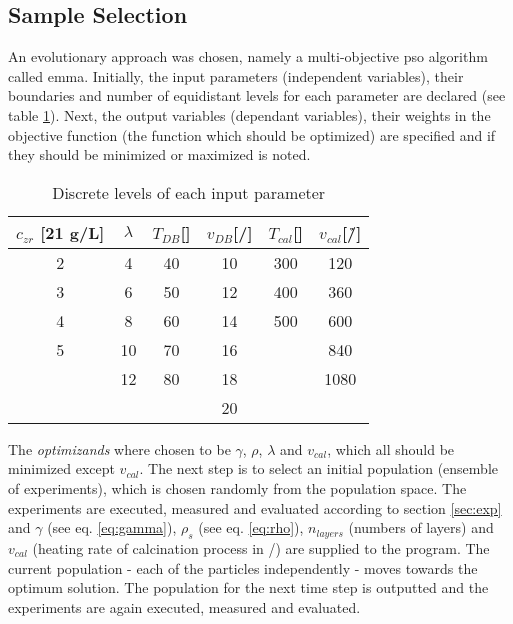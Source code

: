 \subsection{Sample Selection}
\label{sec:ss}
An evolutionary approach was chosen, namely a multi-objective 
\gls{pso} algorithm called \gls{emma}\cite{villanova2010function,Kennedy1995,Breiman1997,Carta2011}.
%
%
Initially, the input parameters (independent variables), their boundaries and number of equidistant levels for each parameter are declared (see table \ref{tab:input}).
Next, the output variables (dependant variables), their weights in the objective function (the function which should be optimized) are specified and if they should be minimized or maximized is noted.
%
\begin{table}[htb]
	\centering
	\begin{tabular}{cc cc cc}
		\hline
        $c_{zr}$ [21 g/L]	&$\lambda$	&$T_{DB}$[\oc{}]	&$v_{DB}$[\mm{}/\s{}]	&$T_{cal}$[\oc{}]	&$v_{cal}$[\oc{}/\h{}]	\\
		\hline
		2				&4		&40					&10				&300				&120	\\
		3				&6		&50					&12				&400				&360	\\
		4				&8		&60					&14				&500				&600	\\
		5				&10		&70					&16				&					&840	\\
						&12		&80					&18				&					&1080	\\
						&		&					&20				&					&		\\
		\hline
	\end{tabular}
	\caption{Discrete levels of each input parameter }
	\label{tab:input}
\end{table}

The \textit{optimizands} where chosen to be $\gamma$, $\rho$, $\lambda$ and $v_{cal}$, which all should be minimized except $v_{cal}$.
The next step is to select an initial population (ensemble of experiments), which is chosen randomly from the population space. 
The experiments are executed, measured and evaluated according to section \ref{sec:exp} and $\gamma$ (see eq. \ref{eq:gamma}), $\rho_s$ (see eq. \ref{eq:rho}), $n_{layers}$ (numbers of layers) and $v_{cal}$ (heating rate of calcination process in \oc{}/\minutes{}) are supplied to the program. 
The current population - each of the particles independently - moves towards the optimum solution.
The population for the next time step is outputted and the experiments are again executed, measured and evaluated.

